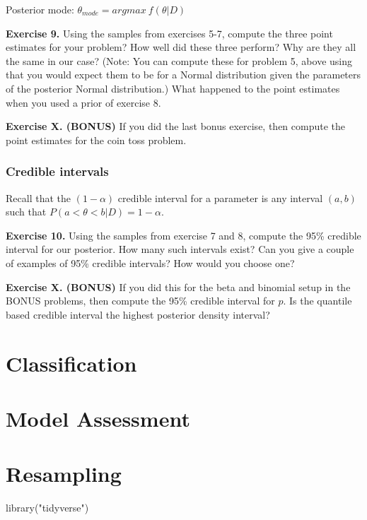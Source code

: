 \documentclass[
]{book}
\newenvironment{Shaded}{\begin{snugshade}}{\end{snugshade}}
\newcommand{\FunctionTok}[1]{\textcolor[rgb]{0.00,0.00,0.00}{#1}}
\newcommand{\NormalTok}[1]{#1}
\newcommand{\StringTok}[1]{\textcolor[rgb]{0.31,0.60,0.02}{#1}}
\begin{document}
Posterior mode: \(\theta_{mode} = argmax~f(\theta | D)\)

\textbf{Exercise 9.} Using the samples from exercises 5-7, compute the three point estimates for your problem? How well did these three perform? Why are they all the same in our case? (Note: You can compute these for problem 5, above using that you would expect them to be for a Normal distribution given the parameters of the posterior Normal distribution.) What happened to the point estimates when you used a prior of exercise 8.

\textbf{Exercise X. (BONUS)} If you did the last bonus exercise, then compute the point estimates for the coin toss problem.

\hypertarget{credible-intervals}{%
\subsection{Credible intervals}\label{credible-intervals}}

Recall that the \((1-\alpha)\) credible interval for a parameter is any interval \((a, b)\) such that \(P(a < \theta < b | D) = 1-\alpha\).

\textbf{Exercise 10.} Using the samples from exercise 7 and 8, compute the 95\% credible interval for our posterior. How many such intervals exist? Can you give a couple of examples of 95\% credible intervals? How would you choose one?

\textbf{Exercise X. (BONUS)} If you did this for the beta and binomial setup in the BONUS problems, then compute the 95\% credible interval for \(p\). Is the quantile based credible interval the highest posterior density interval?

\hypertarget{classification}{%
\chapter{Classification}\label{classification}}

\hypertarget{model-assessment}{%
\chapter{Model Assessment}\label{model-assessment}}

\hypertarget{resampling}{%
\chapter{Resampling}\label{resampling}}

\begin{Shaded}
\begin{Highlighting}[]
\FunctionTok{library}\NormalTok{(}\StringTok{"tidyverse"}\NormalTok{)}
\end{Highlighting}
\end{Shaded}
\end{document}
